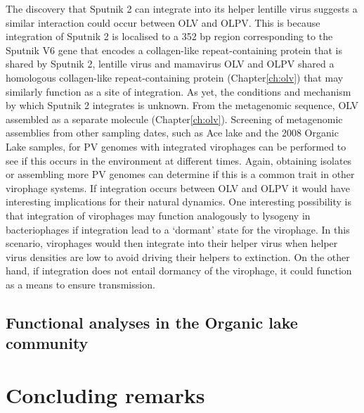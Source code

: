 The discovery that Sputnik 2 can integrate into its helper lentille virus suggests a similar interaction could occur between \ac{OLV} and \ac{OLPV}.
This is because integration of Sputnik 2 is localised to a 352 bp region corresponding to the Sputnik V6 gene that encodes a collagen-like repeat-containing protein that is shared by Sputnik 2, lentille virus and mamavirus  \cite{Desnues2012} 
\ac{OLV} and \ac{OLPV} shared a homologous collagen-like repeat-containing protein (Chapter\ref{ch:olv}) that may similarly function as a site of integration.
As yet, the conditions and mechanism by which Sputnik 2 integrates is unknown.
From the metagenomic sequence, \ac{OLV} assembled as a separate molecule (Chapter\ref{ch:olv}).
Screening of metagenomic assemblies from other sampling dates, such as Ace lake and the 2008 Organic Lake samples, for \ac{PV} genomes with integrated virophages can be performed to see if this occurs in the environment at different times.
Again, obtaining isolates or assembling more \ac{PV} genomes can determine if this is a common trait in other virophage systems.
If integration occurs between \ac{OLV} and \ac{OLPV} it would have interesting implications for their natural dynamics.
One interesting possibility is that integration of virophages may function analogously to lysogeny in bacteriophages if integration lead to a `dormant' state for the virophage.
In this scenario, virophages would then integrate into their helper virus when helper virus densities are low to avoid driving their helpers to extinction.
On the other hand, if integration does not entail dormancy of the virophage, it could function as a means to ensure transmission.



\subsection{Functional analyses in the Organic lake community}


\section{Concluding remarks}

